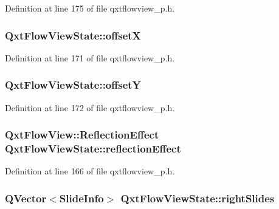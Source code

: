 Definition at line 175 of file qxtflowview\-\_\-p.\-h.

\hypertarget{class_qxt_flow_view_state_a1e70b9c026c4dc5b031a4e72cb3fe1f6}{
\subsubsection[{offset\-X}]{ Qxt\-Flow\-View\-State\-::offset\-X}}\label{class_qxt_flow_view_state_a1e70b9c026c4dc5b031a4e72cb3fe1f6}


Definition at line 171 of file qxtflowview\-\_\-p.\-h.

\hypertarget{class_qxt_flow_view_state_aaaf7d775e1f33c14e264c1ba7b790e9f}{
\subsubsection[{offset\-Y}]{ Qxt\-Flow\-View\-State\-::offset\-Y}}\label{class_qxt_flow_view_state_aaaf7d775e1f33c14e264c1ba7b790e9f}


Definition at line 172 of file qxtflowview\-\_\-p.\-h.

\hypertarget{class_qxt_flow_view_state_a0b8d2993bdd30ef9f3dc2bc4354c6fc2}{
\subsubsection[{reflection\-Effect}]{\setlength{\rightskip}{0pt plus 5cm}Qxt\-Flow\-View\-::\-Reflection\-Effect Qxt\-Flow\-View\-State\-::reflection\-Effect}}\label{class_qxt_flow_view_state_a0b8d2993bdd30ef9f3dc2bc4354c6fc2}


Definition at line 166 of file qxtflowview\-\_\-p.\-h.

\hypertarget{class_qxt_flow_view_state_ad3d83aae413b0c03b09978e40cb4926b}{
\subsubsection[{right\-Slides}]{\setlength{\rightskip}{0pt plus 5cm}Q\-Vector$<${\bf Slide\-Info}$>$ Qxt\-Flow\-View\-State\-::right\-Slides}}\label{class_qxt_flow_view_state_ad3d83aae413b0c03b09978e40cb4926b}



